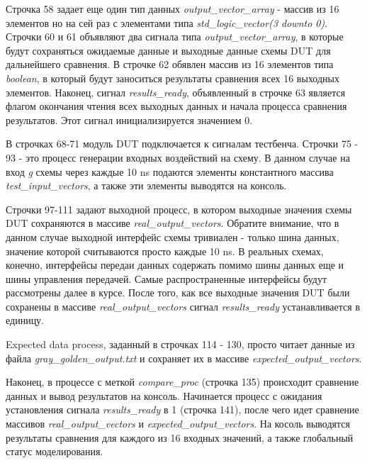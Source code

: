 Строчка 58 задает еще один тип данных \emph{output\_vector\_array} - массив из 16 элементов но на сей раз с элементами типа \emph{std\_logic\_vector(3 downto 0)}. Строчки 60 и 61 объявляют два сигнала типа \emph{output\_vector\_array}, в которые будут сохраняться ожидаемые данные и выходные данные схемы DUT для дальнейшего сравнения. В строчке 62 обявлен массив из 16 элементов типа \emph{boolean}, в который будут заноситься результаты сравнения всех 16 выходных элементов. Наконец, сигнал \emph{results\_ready}, объявленный в строчке 63 является флагом окончания чтения всех выходных данных и начала процесса сравнения результатов. Этот сигнал инициализируется значением 0. 

В строчках 68-71 модуль DUT подключается к сигналам тестбенча. Строчки 75 - 93 - это процесс генерации входных воздействий на схему. В данном случае на вход \emph{g} схемы через каждые 10 ns подаются элементы константного массива \emph{test\_input\_vectors}, а также эти элементы выводятся на консоль. 

Строчки 97-111 задают выходной процесс, в котором выходные значения схемы DUT сохраняются в массиве \emph{real\_output\_vectors}. Обратите внимание, что в данном случае выходной интерфейс схемы тривиален - только шина данных, значение которой считываются просто каждые 10 ns. В реальных схемах, конечно, интерфейсы передаи данных содержать помимо шины данных еще и шины управления передачей. Самые распространенные интерфейсы будут рассмотрены далее в курсе. После того, как все выходные значения DUT были сохранены в массиве \emph{real\_output\_vectors} сигнал \emph{results\_ready} устанавливается в единицу. 

Expected data process, заданный в строчках 114 - 130, просто читает данные из файла \emph{gray\_golden\_output.txt} и сохраняет их в массиве \emph{expected\_output\_vectors}. 

Наконец, в процессе с меткой \emph{compare\_proc} (строчка 135) происходит сравнение данных и вывод результатов на консоль. Начинается процесс с ожидания установления сигнала \emph{results\_ready} в 1 (строчка 141), после чего идет сравнение массивов \emph{real\_output\_vectors} и \emph{expected\_output\_vectors}. На косоль выводятся результаты сравнения для каждого из 16 входных значений, а также глобальный статус моделирования. 




